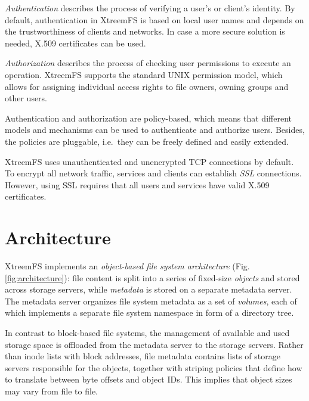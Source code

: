 \documentclass[a4paper,10pt]{book}
\begin{document}
\emph{Authentication}  describes the process of verifying a user's or client's identity. By default, authentication in XtreemFS is based on local user names and depends on the trustworthiness of clients and networks. In case a more secure solution is needed, X.509 certificates can be used.

\emph{Authorization} describes the process of checking user permissions to execute an operation. XtreemFS supports the standard UNIX permission model, which allows for assigning individual access rights to file owners, owning groups and other users.

Authentication and authorization are policy-based, which means that different models and mechanisms can be used to authenticate and authorize users. Besides, the policies are pluggable, i.e.\ they can be freely defined and easily extended.

XtreemFS uses unauthenticated and unencrypted TCP connections by default. To encrypt all network traffic, services and clients can establish \emph{SSL} connections. However, using SSL requires that all users and services have valid X.509 certificates.


\section{Architecture}
XtreemFS implements an \emph{object-based file system architecture} (Fig. \ref{fig:architecture}): file content is split into a series of fixed-size \emph{objects} and stored across storage servers, while \emph{metadata} is stored on a separate metadata server. The metadata server organizes file system metadata as a set of \emph{volumes}, each of which implements a separate file system namespace in form of a directory tree.

In contrast to block-based file systems, the management of available and used storage space is offloaded from the metadata server to the storage servers. Rather than inode lists with block addresses, file metadata contains lists of storage servers responsible for the objects, together with striping policies that define how to translate between byte offsets and object IDs. This implies that object sizes may vary from file to file.
\end{document}
